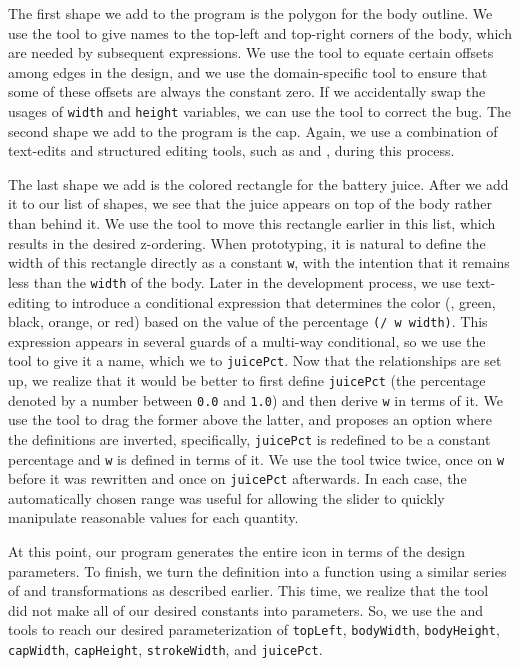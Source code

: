 The first shape we add to the program is the polygon for the body outline. We use the
 tool to give names to the top-left and top-right
corners of the body, which are needed by subsequent expressions.
We use the  tool to equate certain offsets among edges in
the design, and we use the domain-specific  tool to ensure that
some of these offsets are always the constant zero. If we accidentally
swap the usages of \verb+width+ and \verb+height+ variables,
we can use the 
tool to correct the bug. The second shape we add to the program
is the cap. Again, we use a combination of text-edits and structured
editing tools, such as  and ,
during this process.

The last shape we add is the colored rectangle for the battery juice.
After we add it to our list of shapes, we see that the juice appears
on top of the body rather than behind it. We use the 
tool to move this rectangle earlier in this list, which results in the
desired z-ordering.
When prototyping, it is
natural to define the width of this rectangle directly as a constant
\verb+w+, with the intention that it remains less than the \verb+width+ of the body.
Later in the development process,
we use text-editing to introduce a conditional
expression that determines the color (\ie{}, green, black, orange, or
red) based on the value of the percentage \verb+(/ w width)+. This
expression appears in several guards of a multi-way conditional, so
we use the  tool to give it a name,
which we  to \verb+juicePct+. Now that the relationships are set
up, we realize that it would be better to first define \verb+juicePct+
(the percentage denoted by a number between \verb+0.0+ and \verb+1.0+)
and then derive \verb+w+ in terms of it. We use the 
tool to drag the former above the latter, and \deuce{} proposes an
option where the definitions are inverted, specifically,
\verb+juicePct+ is redefined to be a constant percentage and \verb+w+
is defined in terms of it. We use the  tool twice twice, once
on \verb+w+ before it was rewritten and once on \verb+juicePct+
afterwards. In each case, the automatically chosen range was useful
for allowing the slider to quickly manipulate reasonable values for
each quantity.

At this point, our program generates the entire icon in terms of the design
parameters. To finish, we turn the definition into a function
using a similar series of  and  transformations as described earlier.
This time, we realize
that the  tool did not make all of our desired constants into
parameters. So, we use the  and  tools to reach our
desired parameterization of \verb+topLeft+, \verb+bodyWidth+, \verb+bodyHeight+,
\verb+capWidth+, \verb+capHeight+, \verb+strokeWidth+, and \verb+juicePct+.


